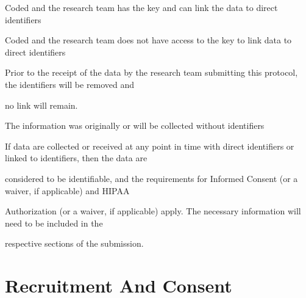 \documentclass[10pt, letterpaper]{article}
\begin{document}
\noindent \makebox[0pt][l]{\color{columbiablue_official}$\boxtimes$}\hspace{1.2em} Coded and the research team has the key and can link the data to direct identifiers

\noindent \makebox[0pt][l]{$\square$}\hspace{1.2em} Coded and the research team does not have access to the key to link data to direct identifiers

\noindent \makebox[0pt][l]{$\square$}\hspace{1.2em} Prior to the receipt of the data by the research team submitting this protocol, the identifiers will be removed and

\begin{responsebox}

no link will remain.

\end{responsebox}

\noindent \makebox[0pt][l]{$\square$}\hspace{1.2em} The information was originally or will be collected without identifiers

\vspace{0.5em}

\vspace{0.5em}

\vspace{0.5em}

If data are collected or received at any point in time with direct identifiers or linked to identifiers, then the data are

considered to be identifiable, and the requirements for Informed Consent (or a waiver, if applicable) and HIPAA

Authorization (or a waiver, if applicable) apply. The necessary information will need to be included in the

respective sections of the submission.

\vspace{0.5em}

\vspace{0.5em}

\vspace{0.5em}

\section*{Recruitment And Consent}

\vspace{0.5em}
\end{document}
